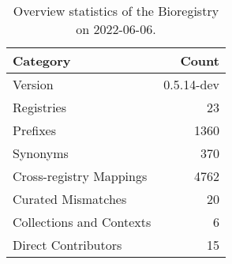 \begin{table}
\centering
\caption{Overview statistics of the Bioregistry on 2022-06-06.}
\label{tab:bioregistry-summary}
\begin{tabular}{lr}
\toprule
                Category &      Count \\
\midrule
                 Version & 0.5.14-dev \\
              Registries &         23 \\
                Prefixes &       1360 \\
                Synonyms &        370 \\
 Cross-registry Mappings &       4762 \\
      Curated Mismatches &         20 \\
Collections and Contexts &          6 \\
     Direct Contributors &         15 \\
\bottomrule
\end{tabular}
\end{table}
